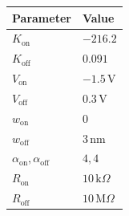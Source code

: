 \begin{tabular}{ll}
\hline
Parameter & Value \\
\hline
$K_\mathrm{on}$ & $-216.2$ \\
$K_\mathrm{off}$ & $0.091$ \\
$V_\mathrm{on}$ & $-1.5\,\mathrm{V}$ \\
$V_\mathrm{off}$ & $0.3\,\mathrm{V}$ \\
$w_\mathrm{on}$ & $0$ \\
$w_\mathrm{off}$ & $3\,\mathrm{nm}$ \\
$\alpha_\mathrm{on}, \alpha_\mathrm{off}$ & $4, 4$ \\
$R_\mathrm{on}$ & $10\,\mathrm{k}\Omega$ \\
$R_\mathrm{off}$ & $10\,\mathrm{M}\Omega$ \\
\hline
\end{tabular}
